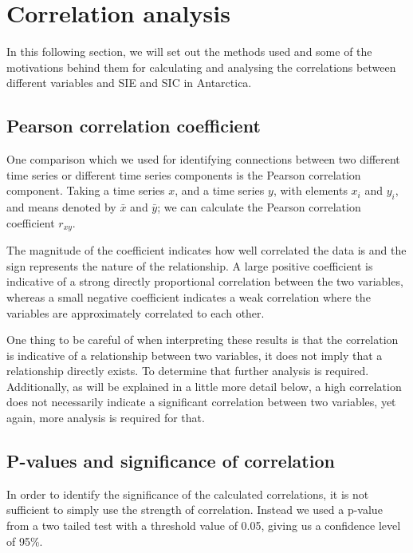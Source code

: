 \section{Correlation analysis}
\label{Methods:pearson}

In this following section, we will set out the methods used and some of the motivations behind them for calculating and analysing the correlations between different variables and SIE and SIC in Antarctica.

\subsection{Pearson correlation coefficient}
One comparison which we used for identifying connections between two different time series or different time series components is the Pearson correlation component. Taking a time series $x$, and a time series $y$, with elements $x_i$ and $y_i$, and means denoted by $\bar{x}$ and $\bar{y}$; we can calculate the Pearson correlation coefficient $r_{xy}$.



The magnitude of the coefficient indicates how well correlated the data is and the sign represents the nature of the relationship. A large positive coefficient is indicative of a strong directly proportional correlation between the two variables, whereas a small negative coefficient indicates a weak correlation where the variables are approximately correlated to each other.

One thing to be careful of when interpreting these results is that the correlation is indicative of a relationship between two variables, it does not imply that a relationship directly exists. To determine that further analysis is required. Additionally, as will be explained in a little more detail below, a high correlation does not necessarily indicate a significant correlation between two variables, yet again, more analysis is required for that.

\subsection{P-values and significance of correlation}
In order to identify the significance of the calculated correlations, it is not sufficient to simply use the strength of correlation. Instead we used a p-value from a two tailed test with a threshold value of 0.05, giving us a confidence level of 95\%.

